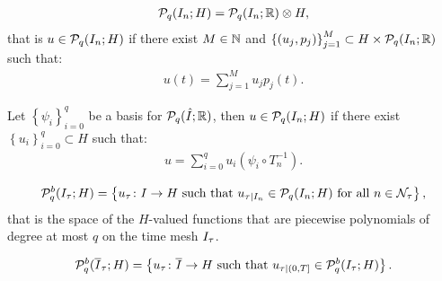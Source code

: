 \begin{definition}[$\SpacePolynomials{q}(I_n; H)$]
    \begin{align}
        \mathcal{P}_{q}(I_n; H) = \mathcal{P}_{q}(I_n; \mathbb{R}) \otimes H,
    \end{align}
    that is $u \in \mathcal{P}_{q}(I_n; H)$ if there exist $M \in \mathbb{N}$ and $\left\{ (u_j, p_j) \right\}_{j = 1}^M \subset H \times \mathcal{P}_{q}(I_n; \mathbb{R})$ such that:
    \begin{align}
        u(t) = \sum_{j = 1}^M u_j p_j(t).
    \end{align}
\end{definition}

Let $\left\{ \psi_i \right\}_{i = 0}^q$ be a basis for $\mathcal{P}_{q}(\hat{I}; \mathbb{R})$, then $u \in \mathcal{P}_{q}(I_n; H)$ if there exist $\left\{ u_i \right\}_{i = 0}^q \subset H$ such that:
\begin{align} %
    u = \sum_{i = 0}^q u_i (\psi_i \circ T_n^{-1}).
\end{align}

\begin{definition}
    \begin{align}
        \mathcal{P}_{q}^b(I_{\tau}; H) = \left\{ u_{\tau} \colon I \rightarrow H \text{ such that } u_{\tau \mid I_n} \in \mathcal{P}_{q}(I_n; H) \text{ for all } n \in \mathcal{N}_{\tau} \right\},
    \end{align}
    that is the space of the $H$-valued functions that are piecewise polynomials of degree at most $q$ on the time mesh $I_{\tau}$.
\end{definition}

\begin{definition}
    \begin{align}
        \mathcal{P}_{q}^b(\overline{I}_{\tau}; H) = \left\{ u_{\tau} \colon \overline{I} \rightarrow H \text{ such that } u_{\tau \mid (0, T]} \in \mathcal{P}_{q}^b(I_{\tau}; H) \right\}.
    \end{align}
\end{definition}


